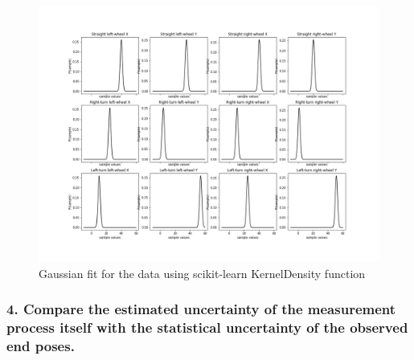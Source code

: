 \documentclass[11pt,a4paper,openright,twoside]{extreport}
\begin{document}
\begin{figure}[ht]
\centering
\includegraphics[width=\textwidth]{gaussian_fits.png}
\caption{Gaussian fit for the data using scikit-learn KernelDensity function}
\label{gaussian}
\end{figure}

\subsubsection*{4. Compare the estimated uncertainty of the measurement process itself with the statistical uncertainty of the observed end poses.}
\end{document}
